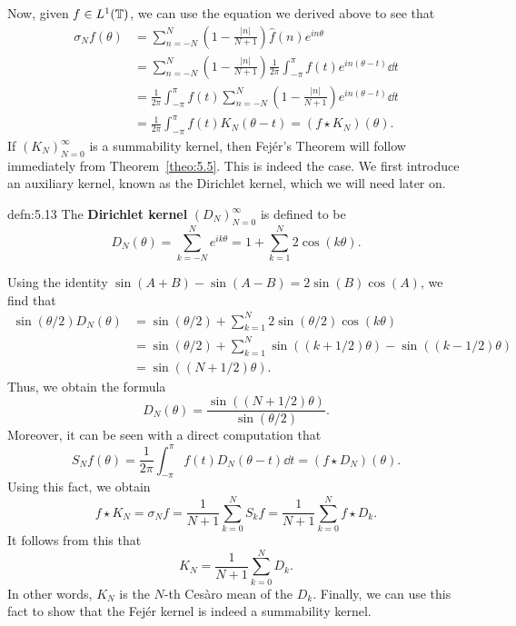 Now, given $f \in L^1(\mathbb{T})$, we can use the equation we derived above to see that 
\begin{align*}
    \sigma_N f (\theta) 
    &= \sum_{n=-N}^N \left( 1 - \frac{|n|}{N+1} \right) \hat f(n) e^{in\theta} \\ 
    &= \sum_{n=-N}^N \left( 1 - \frac{|n|}{N+1} \right) \frac{1}{2\pi} 
    \int_{-\pi}^\pi f(t) e^{in(\theta - t)}\dd t \\ 
    &= \frac{1}{2\pi} \int_{-\pi}^\pi f(t) \sum_{n=-N}^N \left( 1 - 
    \frac{|n|}{N+1} \right) e^{in(\theta - t)}\dd t \\ 
    &= \frac{1}{2\pi} \int_{-\pi}^\pi f(t) K_N(\theta - t) = (f \star K_N)(\theta). 
\end{align*}
If $(K_N)_{N=0}^\infty$ is a summability kernel, then Fej\'er's Theorem will follow 
immediately from Theorem~\ref{theo:5.5}. This is indeed the case. 
We first introduce an auxiliary kernel, known as the Dirichlet kernel, which 
we will need later on. 

\begin{defn}{defn:5.13}
    The {\bf Dirichlet kernel} $(D_N)_{N=0}^\infty$ is defined to be 
    \[ D_N(\theta) = \sum_{k=-N}^N e^{ik\theta} = 1 + \sum_{k=1}^N 2\cos(k\theta). \] 
\end{defn}

Using the identity $\sin(A+B) - \sin(A-B) = 2\sin(B)\cos(A)$, we find that 
\begin{align*}
    \sin(\theta/2) D_N(\theta) 
    &= \sin(\theta/2) + \sum_{k=1}^N 2\sin(\theta/2) \cos(k\theta) \\ 
    &= \sin(\theta/2) + \sum_{k=1}^N \sin((k+1/2)\theta) - \sin((k-1/2)\theta) \\ 
    &= \sin((N + 1/2)\theta).     
\end{align*}
Thus, we obtain the formula 
\[ D_N(\theta) = \frac{\sin((N + 1/2)\theta)}{\sin(\theta/2)}. \] 
Moreover, it can be seen with a direct computation that 
\[ S_N f(\theta) = \frac{1}{2\pi} \int_{-\pi}^\pi f(t) D_N(\theta - t)\dd t 
= (f \star D_N)(\theta). \] 
Using this fact, we obtain 
\[ f \star K_N = \sigma_N f = \frac{1}{N+1} \sum_{k=0}^N S_k f 
= \frac{1}{N+1} \sum_{k=0}^N f \star D_k. \] 
It follows from this that 
\[ K_N = \frac{1}{N+1} \sum_{k=0}^N D_k. \] 
In other words, $K_N$ is the $N$-th Ces\`aro mean of the $D_k$. Finally, 
we can use this fact to show that the Fej\'er kernel is indeed a 
summability kernel. 

